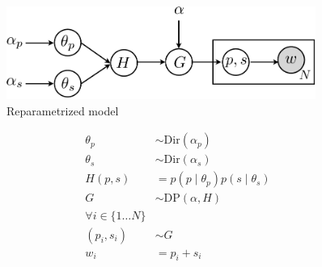 \begin{figure}[h]
\centering
\includegraphics[width=0.9\textwidth]{fig/v2}
\caption{Reparametrized model}
\label{fig:v1}
\end{figure}

\begin{align*}
\theta_p & \sim \text{Dir}(\alpha_p) \\
\theta_s & \sim \text{Dir}(\alpha_s) \\
H(p, s) & = p(p \mid \theta_p) p(s \mid \theta_s) \\
G & \sim \text{DP}\left(\alpha, H\right)\\
\forall i \in \{1 \dots N\} \\
(p_i, s_i) & \sim G \\
w_i & = p_i+s_i
\end{align*}
